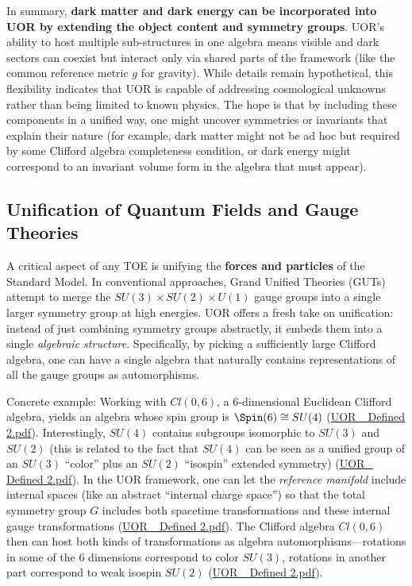 \documentclass[12pt]{article}
\begin{document}
\medskip

In summary, \textbf{dark matter and dark energy can be incorporated into UOR by extending the object content and symmetry groups}. UOR’s ability to host multiple sub-structures in one algebra means visible and dark sectors can coexist but interact only via shared parts of the framework (like the common reference metric $g$ for gravity). While details remain hypothetical, this flexibility indicates that UOR is capable of addressing cosmological unknowns rather than being limited to known physics. The hope is that by including these components in a unified way, one might uncover symmetries or invariants that explain their nature (for example, dark matter might not be ad hoc but required by some Clifford algebra completeness condition, or dark energy might correspond to an invariant volume form in the algebra that must appear).

\subsection{Unification of Quantum Fields and Gauge Theories}

A critical aspect of any TOE is unifying the \textbf{forces and particles} of the Standard Model. In conventional approaches, Grand Unified Theories (GUTs) attempt to merge the $SU(3)\times SU(2)\times U(1)$ gauge groups into a single larger symmetry group at high energies. UOR offers a fresh take on unification: instead of just combining symmetry groups abstractly, it embeds them into a single \emph{algebraic structure}. Specifically, by picking a sufficiently large Clifford algebra, one can have a single algebra that naturally contains representations of all the gauge groups as automorphisms.

\medskip

Concrete example: Working with $Cl(0,6)$, a 6-dimensional Euclidean Clifford algebra, yields an algebra whose spin group is $\Spin(6) \cong SU(4)$ (\href{file://file-TBF3nHDaRR5QeVMmwCFYkp#:~:text=choice%20of%20Clifford%20algebra%20that,Researchers%20have%20explored}{UOR\_ Defined 2.pdf}). Interestingly, $SU(4)$ contains subgroups isomorphic to $SU(3)$ and $SU(2)$ (this is related to the fact that $SU(4)$ can be seen as a unified group of an $SU(3)$ ``color'' plus an $SU(2)$ ``isospin'' extended symmetry) (\href{file://file-TBF3nHDaRR5QeVMmwCFYkp#:~:text=%24Cl%280%2C6%29%24%20%28a%206,g}{UOR\_ Defined 2.pdf}). In the UOR framework, one can let the \emph{reference manifold} include internal spaces (like an abstract ``internal charge space'') so that the total symmetry group $G$ includes both spacetime transformations and these internal gauge transformations (\href{file://file-TBF3nHDaRR5QeVMmwCFYkp#:~:text=let%20the%20reference%20manifold%20be,via%20a%20direct%20product%20or}{UOR\_ Defined 2.pdf}). The Clifford algebra $Cl(0,6)$ then can host both kinds of transformations as algebra automorphisms---rotations in some of the 6 dimensions correspond to color $SU(3)$, rotations in another part correspond to weak isospin $SU(2)$ (\href{file://file-TBF3nHDaRR5QeVMmwCFYkp#:~:text=%24Cl%280%2C6%29%24%20%28a%206,g}{UOR\_ Defined 2.pdf}).
\end{document}
